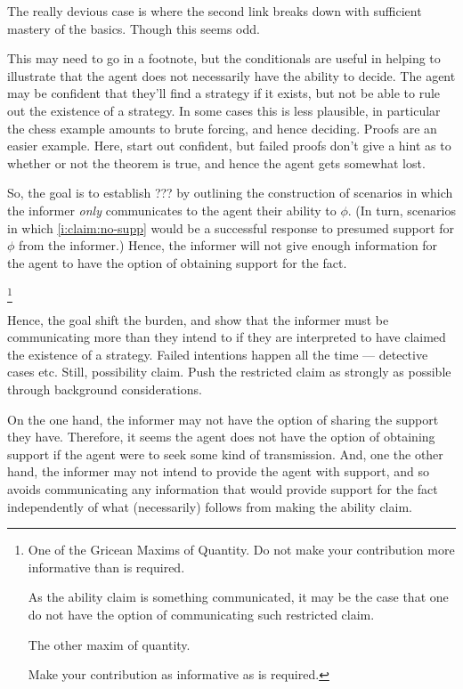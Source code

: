 \documentclass[10pt]{article}
\begin{document}
The really devious case is where the second link breaks down with sufficient mastery of the basics.
Though this seems odd.


\begin{note}
  This may need to go in a footnote, but the conditionals are useful in helping to illustrate that the agent does not necessarily have the ability to decide.
  The agent may be confident that they'll find a strategy if it exists, but not be able to rule out the existence of a strategy.
  In some cases this is less plausible, in particular the chess example amounts to brute forcing, and hence deciding.
  Proofs are an easier example.
  Here, start out confident, but failed proofs don't give a hint as to whether or not the theorem is true, and hence the agent gets somewhat lost.
\end{note}


So, the goal is to establish ??? by outlining the construction of scenarios in which the informer \emph{only} communicates to the agent their ability to \(\phi\).
(In turn, scenarios in which \ref{i:claim:no-supp} would be a successful response to presumed support for \(\phi\) from the informer.)
Hence, the informer will not give enough information for the agent to have the option of obtaining support for the fact.

\citeauthor{Grice:1989uf}\footnote{
One of the Gricean Maxims of Quantity.
Do not make your contribution more informative than is required.

As the ability claim is something communicated, it may be the case that one do not have the option of communicating such restricted claim.

The other maxim of quantity.

Make your contribution as informative as is required.
}

Hence, the goal shift the burden, and show that the informer must be communicating more than they intend to if they are interpreted to have claimed the existence of a strategy.
Failed intentions happen all the time --- detective cases etc.
Still, possibility claim.
Push the restricted claim as strongly as possible through background considerations.

{
  \color{red}
  On the one hand, the informer may not have the option of sharing the support they have.
  Therefore, it seems the agent does not have the option of obtaining support if the agent were to seek some kind of transmission.
  And, one the other hand, the informer may not intend to provide the agent with support, and so avoids communicating any information that would provide support for the fact independently of what (necessarily) follows from making the ability claim.
}
\end{document}
